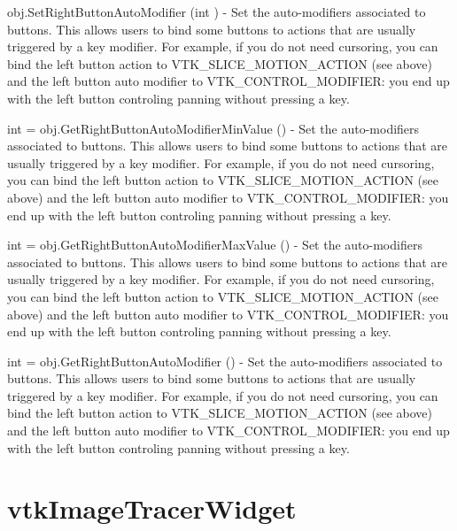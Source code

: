 \begin{DoxyItemize}
\item {\ttfamily obj.\-Set\-Right\-Button\-Auto\-Modifier (int )} -\/ Set the auto-\/modifiers associated to buttons. This allows users to bind some buttons to actions that are usually triggered by a key modifier. For example, if you do not need cursoring, you can bind the left button action to V\-T\-K\-\_\-\-S\-L\-I\-C\-E\-\_\-\-M\-O\-T\-I\-O\-N\-\_\-\-A\-C\-T\-I\-O\-N (see above) and the left button auto modifier to V\-T\-K\-\_\-\-C\-O\-N\-T\-R\-O\-L\-\_\-\-M\-O\-D\-I\-F\-I\-E\-R\-: you end up with the left button controling panning without pressing a key.  
\item {\ttfamily int = obj.\-Get\-Right\-Button\-Auto\-Modifier\-Min\-Value ()} -\/ Set the auto-\/modifiers associated to buttons. This allows users to bind some buttons to actions that are usually triggered by a key modifier. For example, if you do not need cursoring, you can bind the left button action to V\-T\-K\-\_\-\-S\-L\-I\-C\-E\-\_\-\-M\-O\-T\-I\-O\-N\-\_\-\-A\-C\-T\-I\-O\-N (see above) and the left button auto modifier to V\-T\-K\-\_\-\-C\-O\-N\-T\-R\-O\-L\-\_\-\-M\-O\-D\-I\-F\-I\-E\-R\-: you end up with the left button controling panning without pressing a key.  
\item {\ttfamily int = obj.\-Get\-Right\-Button\-Auto\-Modifier\-Max\-Value ()} -\/ Set the auto-\/modifiers associated to buttons. This allows users to bind some buttons to actions that are usually triggered by a key modifier. For example, if you do not need cursoring, you can bind the left button action to V\-T\-K\-\_\-\-S\-L\-I\-C\-E\-\_\-\-M\-O\-T\-I\-O\-N\-\_\-\-A\-C\-T\-I\-O\-N (see above) and the left button auto modifier to V\-T\-K\-\_\-\-C\-O\-N\-T\-R\-O\-L\-\_\-\-M\-O\-D\-I\-F\-I\-E\-R\-: you end up with the left button controling panning without pressing a key.  
\item {\ttfamily int = obj.\-Get\-Right\-Button\-Auto\-Modifier ()} -\/ Set the auto-\/modifiers associated to buttons. This allows users to bind some buttons to actions that are usually triggered by a key modifier. For example, if you do not need cursoring, you can bind the left button action to V\-T\-K\-\_\-\-S\-L\-I\-C\-E\-\_\-\-M\-O\-T\-I\-O\-N\-\_\-\-A\-C\-T\-I\-O\-N (see above) and the left button auto modifier to V\-T\-K\-\_\-\-C\-O\-N\-T\-R\-O\-L\-\_\-\-M\-O\-D\-I\-F\-I\-E\-R\-: you end up with the left button controling panning without pressing a key.  
\end{DoxyItemize}\hypertarget{vtkwidgets_vtkimagetracerwidget}{}\section{vtk\-Image\-Tracer\-Widget}\label{vtkwidgets_vtkimagetracerwidget}
